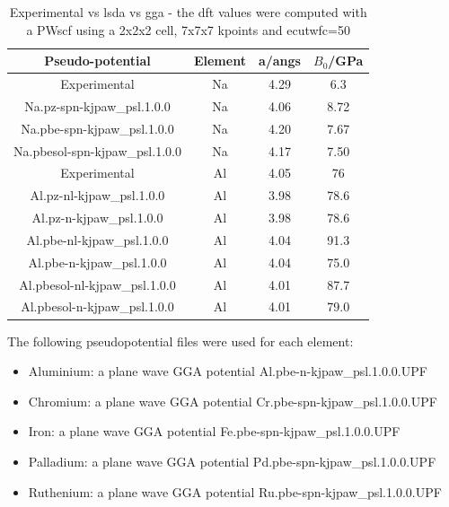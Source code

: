 \FloatBarrier 
\begin{table}[h]
\begin{center}
\renewcommand{\arraystretch}{1.2}
\begin{tabular}{c c c c}
\hline\hline
Pseudo-potential & Element & a/angs & $B_0$/GPa \\
\hline\hline
Experimental    & Na      & 4.29\cite{periodictablena} & 6.3\cite{periodictablena} \\
Na.pz-spn-kjpaw\_psl.1.0.0 & Na & 4.06 & 8.72 \\
Na.pbe-spn-kjpaw\_psl.1.0.0 & Na & 4.20 & 7.67 \\
Na.pbesol-spn-kjpaw\_psl.1.0.0 & Na & 4.17 & 7.50 \\
Experimental    & Al      & 4.05\cite{periodictableal} & 76\cite{periodictableal} \\
Al.pz-nl-kjpaw\_psl.1.0.0 & Al & 3.98 & 78.6 \\
Al.pz-n-kjpaw\_psl.1.0.0 & Al & 3.98 & 78.6 \\
Al.pbe-nl-kjpaw\_psl.1.0.0 & Al & 4.04 & 91.3 \\
Al.pbe-n-kjpaw\_psl.1.0.0 & Al & 4.04 & 75.0 \\
Al.pbesol-nl-kjpaw\_psl.1.0.0 & Al & 4.01 & 87.7 \\
Al.pbesol-n-kjpaw\_psl.1.0.0 & Al & 4.01 & 79.0 \\
\hline\hline
\end{tabular}
\end{center}
\caption{Experimental vs \acrshort{lsda} vs \acrshort{gga} - the \acrshort{dft} values were computed with a PWscf\cite{quantumespresso} using a 2x2x2 cell, 7x7x7 kpoints and ecutwfc=50}
\label{table:ggavslsdacopy}
\end{table}

\FloatBarrier 

The following pseudopotential files were used for each element:

\begin{itemize}
\item Aluminium: a plane wave GGA potential Al.pbe-n-kjpaw\_psl.1.0.0.UPF
\item Chromium: a plane wave GGA potential Cr.pbe-spn-kjpaw\_psl.1.0.0.UPF
\item Iron: a plane wave GGA potential Fe.pbe-spn-kjpaw\_psl.1.0.0.UPF 
\item Palladium: a plane wave GGA potential Pd.pbe-spn-kjpaw\_psl.1.0.0.UPF
\item Ruthenium: a plane wave GGA potential Ru.pbe-spn-kjpaw\_psl.1.0.0.UPF
\end{itemize}

